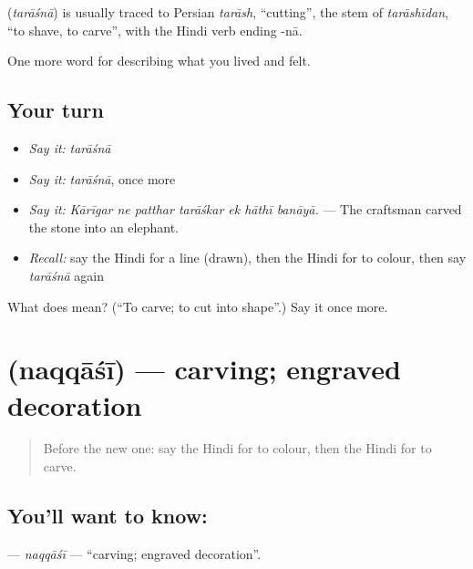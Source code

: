 \begin{cousinweb}
\textbf{} (\emph{tarāśnā}) is usually traced to Persian \emph{tarāsh}, \textquotedblleft{}cutting\textquotedblright{}, the stem of \emph{tarāshīdan}, \textquotedblleft{}to shave, to carve\textquotedblright{}, with the Hindi verb ending -nā.
\end{cousinweb}

\begin{grammarlens}[title={What you've built}]
One more word for describing what you lived and felt.
\end{grammarlens}

\subsection*{Your turn}
\begin{itemize}
\raggedright
  \item \emph{Say it:} \emph{tarāśnā}
  \item \emph{Say it:} \emph{tarāśnā}, once more
  \item \emph{Say it:} \emph{Kārīgar ne patthar tarāśkar ek hāthī banāyā.} — The craftsman carved the stone into an elephant.
  \item \emph{Recall:} say the Hindi for a line (drawn), then the Hindi for to colour, then say \emph{tarāśnā} again
\end{itemize}

\begin{tcolorbox}[breakable,colback=teal!4,colframe=teal!35!black,title={Before you move on}]
What does  mean? (\textquotedblleft{}To carve; to cut into shape\textquotedblright{}.) Say it once more.
\end{tcolorbox}
\section[\texorpdfstring{\hi{नक़्क़ाशी} (naqqāśī)}{नक़्क़ाशी (naqqāśī)}]{ (naqqāśī) — carving; engraved decoration}

\label{lesson:HI-C528-naqqasi}



\begin{quote}
Before the new one: say the Hindi for to colour, then the Hindi for to carve.
\end{quote}

\subsection*{You'll want to know: }
\textbf{} — \emph{naqqāśī} — \textquotedblleft{}carving; engraved decoration\textquotedblright{}.

